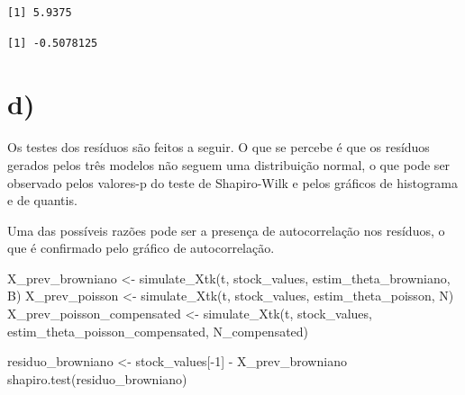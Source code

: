 \documentclass[
  letterpaper,
  DIV=11,
  numbers=noendperiod]{scrreprt}
\newenvironment{Shaded}{\begin{snugshade}}{\end{snugshade}}
\newcommand{\AttributeTok}[1]{\textcolor[rgb]{0.40,0.45,0.13}{#1}}
\newcommand{\DecValTok}[1]{\textcolor[rgb]{0.68,0.00,0.00}{#1}}
\newcommand{\DocumentationTok}[1]{\textcolor[rgb]{0.37,0.37,0.37}{\textit{#1}}}
\newcommand{\FunctionTok}[1]{\textcolor[rgb]{0.28,0.35,0.67}{#1}}
\newcommand{\NormalTok}[1]{\textcolor[rgb]{0.00,0.23,0.31}{#1}}
\newcommand{\OtherTok}[1]{\textcolor[rgb]{0.00,0.23,0.31}{#1}}
\newcommand{\SpecialCharTok}[1]{\textcolor[rgb]{0.37,0.37,0.37}{#1}}
\begin{document}
\begin{verbatim}
[1] 5.9375
\end{verbatim}

\begin{Shaded}
\end{Shaded}

\begin{verbatim}
[1] -0.5078125
\end{verbatim}

\hypertarget{d}{%
\section*{d)}\label{d}}


Os testes dos resíduos são feitos a seguir. O que se percebe é que os
resíduos gerados pelos três modelos não seguem uma distribuição normal,
o que pode ser observado pelos valores-p do teste de Shapiro-Wilk e
pelos gráficos de histograma e de quantis.

Uma das possíveis razões pode ser a presença de autocorrelação nos
resíduos, o que é confirmado pelo gráfico de autocorrelação.

\begin{Shaded}
\begin{Highlighting}[]
\NormalTok{X\_prev\_browniano }\OtherTok{\textless{}{-}}
    \FunctionTok{simulate\_Xtk}\NormalTok{(t, stock\_values, estim\_theta\_browniano, B)}
\NormalTok{X\_prev\_poisson }\OtherTok{\textless{}{-}}
    \FunctionTok{simulate\_Xtk}\NormalTok{(t, stock\_values, estim\_theta\_poisson, N)}
\NormalTok{X\_prev\_poisson\_compensated }\OtherTok{\textless{}{-}}
    \FunctionTok{simulate\_Xtk}\NormalTok{(t, stock\_values, estim\_theta\_poisson\_compensated, N\_compensated)}

\NormalTok{residuo\_browniano }\OtherTok{\textless{}{-}}\NormalTok{ stock\_values[}\SpecialCharTok{{-}}\DecValTok{1}\NormalTok{] }\SpecialCharTok{{-}}\NormalTok{ X\_prev\_browniano}
\FunctionTok{shapiro.test}\NormalTok{(residuo\_browniano)}
\end{Highlighting}
\end{Shaded}
\end{document}

